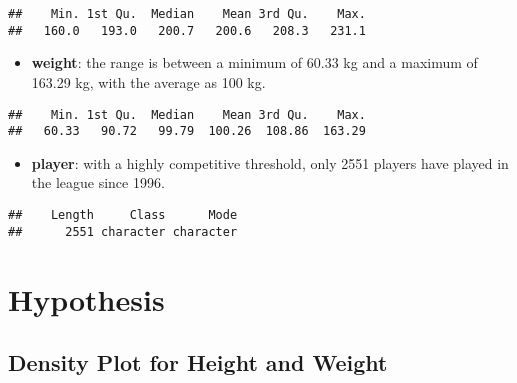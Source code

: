 \documentclass[
]{book}
\newenvironment{Shaded}{\begin{snugshade}}{\end{snugshade}}
\newcommand{\FunctionTok}[1]{\textcolor[rgb]{0.13,0.29,0.53}{\textbf{#1}}}
\newcommand{\NormalTok}[1]{#1}
\newcommand{\SpecialCharTok}[1]{\textcolor[rgb]{0.81,0.36,0.00}{\textbf{#1}}}
\providecommand{\tightlist}{%
  \setlength{\itemsep}{0pt}\setlength{\parskip}{0pt}}
\begin{document}
\begin{verbatim}
##    Min. 1st Qu.  Median    Mean 3rd Qu.    Max. 
##   160.0   193.0   200.7   200.6   208.3   231.1
\end{verbatim}

\begin{itemize}
\tightlist
\item
  \textbf{weight}: the range is between a minimum of 60.33 kg and a maximum of 163.29 kg, with the average as 100 kg.
\end{itemize}

\begin{Shaded}
\end{Shaded}

\begin{verbatim}
##    Min. 1st Qu.  Median    Mean 3rd Qu.    Max. 
##   60.33   90.72   99.79  100.26  108.86  163.29
\end{verbatim}

\begin{itemize}
\tightlist
\item
  \textbf{player}: with a highly competitive threshold, only 2551 players have played in the league since 1996.
\end{itemize}

\begin{Shaded}
\end{Shaded}

\begin{verbatim}
##    Length     Class      Mode 
##      2551 character character
\end{verbatim}

\hypertarget{hypothesis}{%
\chapter{Hypothesis}\label{hypothesis}}

\hypertarget{density-plot-for-height-and-weight}{%
\section{Density Plot for Height and Weight}\label{density-plot-for-height-and-weight}}
\end{document}
